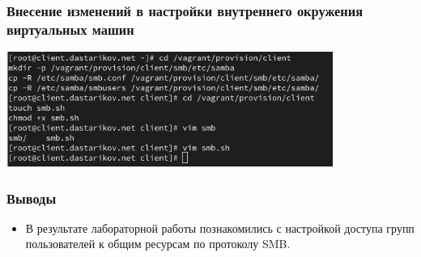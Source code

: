 \begin{frame}
\frametitle{Внесение изменений в настройки внутреннего окружения виртуальных машин}
    \includegraphics[width=0.8\textwidth]{../images/image26.png}
\end{frame}

\begin{frame}
\frametitle{Выводы}
\begin{itemize}
    \item В результате лабораторной работы познакомились с настройкой доступа групп пользователей к общим ресурсам по протоколу SMB.
\end{itemize}
\end{frame}

